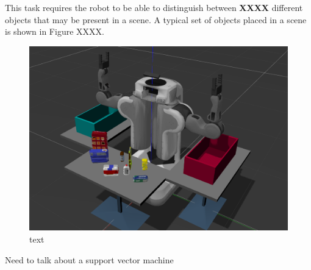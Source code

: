\documentclass[a4paper]{article}
\begin{document}
This task requires the robot to be able to distinguish between \textbf{XXXX} different objects that may be present in a scene. A typical set of objects placed in a scene is shown in Figure XXXX.
\begin{figure}[h]
\centering
\includegraphics[scale=0.15]{object_layout}
\caption{text}
\end{figure}

Need to talk about a support vector machine
\newpage
\end{document}
